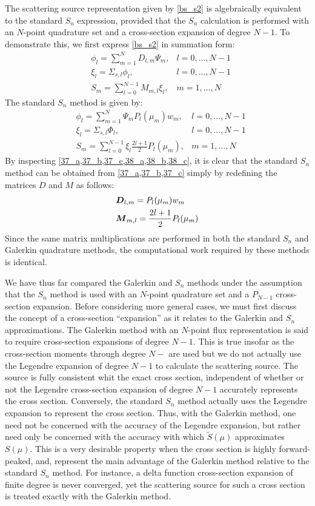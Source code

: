 The scattering source representation given by \cref{bs_s2} is
algebraically equivalent to the standard $S_n$ expression, provided that the
$S_n$ calculation is performed with an $N$-point quadrature set and a
cross-section expansion of degree $N-1$. To demonstrate this, we first express
\cref{bs_s2} in summation form:
\begin{align}
&\phi_l = \sum_{m=1}^N D_{l,m} \Psi_m, & l=0,\hdots,N-1 \label{37_a}\\
&\xi_l = \Sigma_{s,l} \phi_l, & l=0,\hdots,N-1 \label{37_b}\\
&S_m = \sum_{l=0}^{N-1} M_{m,l}\xi_l, & m=1,\hdots,N \label{37_c}
\end{align}
The standard $S_n$ method is given by:
\begin{align}
&\phi_l = \sum_{m=1}^N \Psi_m P_l(\mu_m) w_m, & l=0,\hdots,N-1 \label{38_a}\\
&\xi_l = \Sigma_{s,l} \Phi_l, & l=0,\hdots, N-1 \label{38_b} \\
&S_m = \sum_{l=0}^{N-1}\xi_l \frac{2l+1}{2}P_l(\mu_m), & m=1,\hdots,N
\label{38_c}
\end{align}
By inspecting \cref{37_a,37_b,37_c,38_a,38_b,38_c}, it is clear that the
standard $S_n$ method can be obtained from \cref{37_a,37_b,37_c} simply by
redefining the matrices $D$ and $M$ as follows:
\begin{align}
& \bs{D}_{l,m} = P_l(\mu_m) w_m \label{39_a}\\
& \bs{M}_{m,l} = \frac{2l+1}{2} P_l(\mu_m) \label{39_b}
\end{align}
Since the same matrix multiplications are performed in both the standard
$S_n$ and Galerkin quadrature methods, the computational work required by
these methods is identical.

We have thus far compared the Galerkin and $S_n$ methods under the assumption
that the $S_n$ method is used with an $N$-point quadrature set and a $P_{N-1}$
cross-section expansion. Before considering more general cases, we must first
discuss the concept of a cross-section ``expansion'' as it relates to the
Galerkin and $S_n$ approximations. The Galerkin method with an $N$-point flux
representation is said to require cross-section expansions of degree $N-1$.
This is true insofar as the cross-section moments through degree $N-$ are used
but we do not actually use the Legendre expansion of
degree $N-1$ to calculate the scattering source. The source is fully
consistent whit the exact cross section, independent of whether or not the
Legendre cross-section expansion of degree $N-1$ accurately represents the 
cross section. Conversely, the standard $S_n$ method actually uses the Legendre 
expansion to represent the cross section. Thus, with the Galerkin method, one 
need not be concerned with the accuracy of the Legendre expansion, but rather 
need only be concerned with the accuracy with which $\tilde{S}(\mu)$ approximates 
$S(\mu)$. This is a very desirable property when the cross section is highly 
forward-peaked, and, represent the main advantage of the Galerkin method relative 
to the standard $S_n$ method. For instance, a delta function cross-section expansion 
of finite degree is never converged, yet the scattering source for such a cross 
section is treated exactly with the Galerkin method.

